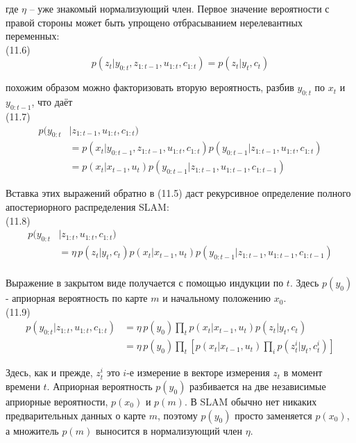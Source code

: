 \documentclass[10pt,a4paper]{article}
\begin{document}
где $\eta$ – уже знакомый нормализующий член. Первое значение  вероятности с правой стороны может быть упрощено отбрасыванием нерелевантных переменных:\\

(11.6)
$$p(z_t|y_{0:t},z_{1:t-1},u_{1:t},c_{1:t})=p(z_t|y_t,c_t)$$

похожим образом можно факторизовать вторую вероятность, разбив $y_{0:t}$ по $x_t$ и $y_{0:t-1}$, что даёт\\

(11.7)
\begin{equation*}
\begin{split}
p(y_{0:t}&|z_{1:t-1},u_{1:t},c_{1:t})\\
&=p(x_t|y_{0:t-1},z_{1:t-1},u_{1:t},c_{1:t})p(y_{0:t-1}|z_{1:t-1},u_{1:t},c_{1:t})\\
&=p(x_t|x_{t-1},u_t)p(y_{0:t-1}|z_{1:t-1},u_{1:t-1},c_{1:t-1})
\end{split}
\end{equation*}

Вставка этих выражений обратно в (11.5) даст рекурсивное определение полного апостериорного распределения SLAM:\\

(11.8)
\begin{equation*}
\begin{split}
p(y_{0:t}&|z_{1:t},u_{1:t},c_{1:t})\\
&=\eta\,p(z_t|y_t,c_t)p(x_t|x_{t-1},u_t)p(y_{0:t-1}|z_{1:t-1},u_{1:t-1},c_{1:t-1})\\
\end{split}
\end{equation*}

Выражение в закрытом виде получается с помощью индукции по $t$. Здесь $p(y_0)$ - априорная вероятность по карте $m$ и начальному положению $x_0$.\\

(11.9)
\begin{equation*}
\begin{split}
p(y_{0:t}|z_{1:t},u_{1:t},c_{1:t})&=\eta\,p(y_0)\prod_t p(x_t|x_{t-1},u_t)p(z_t|y_t,c_t)\\
&=\eta\,p(y_0)\prod_t\left[  p(x_t|x_{t-1},u_t)\prod_i p(z_t^i|y_t,c_t^i)\right] 
\end{split}
\end{equation*}

Здесь, как и прежде, $z_t^i$ это $i$-е измерение в векторе измерения $z_t$ в момент времени $t$. Априорная вероятность $p(y_0)$ разбивается на две независимые априорные вероятности, $p(x_0)$ и $p(m)$. В SLAM обычно нет никаких предварительных данных о карте $m$, поэтому $p(y_0)$ просто заменяется $p(x_0)$, а множитель $p(m)$ выносится в нормализующий член $\eta$.\\
\end{document}

